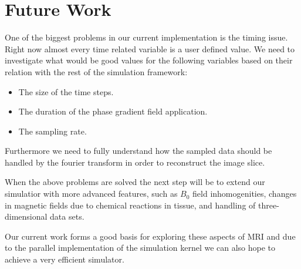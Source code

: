 \section{Future Work}


One of the biggest problems in our current implementation is the
timing issue. Right now almost every time related variable is a user
defined value. We need to investigate what would be good values for the
following variables based on their relation with the rest of the simulation
framework:
\begin{itemize}
\item The size of the time steps.
\item The duration of the phase gradient field application.
\item The sampling rate.
\end{itemize}
Furthermore we need to fully understand how the sampled data should be
handled by the fourier transform in order to reconstruct the image slice.

When the above problems are solved the next step will be to extend our
simulatior with more advanced features, such as $B_0$ field
inhomogenities, changes in magnetic fields due to chemical reactions
in tissue, and handling of three-dimensional data sets.

Our current work forms a good basis for exploring these aspects of MRI
and due to the parallel implementation of the simulation kernel we can
also hope to achieve a very efficient simulator.
